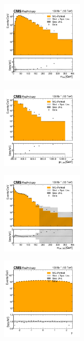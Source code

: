 \begin{figure}[h!]
  \centering
  \begin{subfigure}
    \centering
    \includegraphics[width=0.45\textwidth]{figures/multijet/dijet/mjet_allyears_coarsebin.png}
  \end{subfigure}
  \begin{subfigure}
    \centering
    \includegraphics[width=0.45\textwidth]{figures/multijet/dijet/pt_allyears_coarsebin.png}
  \end{subfigure}
  \begin{subfigure}
    \centering
    \includegraphics[width=0.45\textwidth]{figures/multijet/dijet/msd_allyears_coarsebin.png}
  \end{subfigure}
  \begin{subfigure}
    \centering
    \includegraphics[width=0.45\textwidth]{figures/multijet/dijet/rap_allyears_coarsebin.png}

\end{subfigure}
\end{figure}
